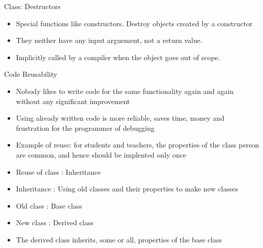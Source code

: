 \documentclass{beamer}
\begin{document}
\begin{frame}[fragile]{Class: Destructors}
  \begin{itemize}
  \item Special functions like constructors. Destroy objects created by a constructor\pause
  \item They neither have any input arguement, not a return value.\pause
  \item Implicitly called by a compiler when the object goes out of scope. 
  \end{itemize}
\end{frame}

\begin{frame}[fragile]{Code Reusability}
  \begin{itemize}
  \item Nobody likes to write code for the same functionality again and again without any significant improvement\pause
  \item Using already written code is more reliable, saves time, money and frustration for the programmer of debugging\pause
  \item Example of reuse: for students and teachers, the properties of the class person are common, and hence should be implented only once\pause
  \item Reuse of class : Inheritance\pause
  \item Inheritance : Using old classes and their properties to make new classes\pause
  \item Old class : Base class\pause
  \item New class : Derived class\pause
  \item The derived class inherits, some or all, properties of the base class
  \end{itemize}
\end{frame}

\end{document}

